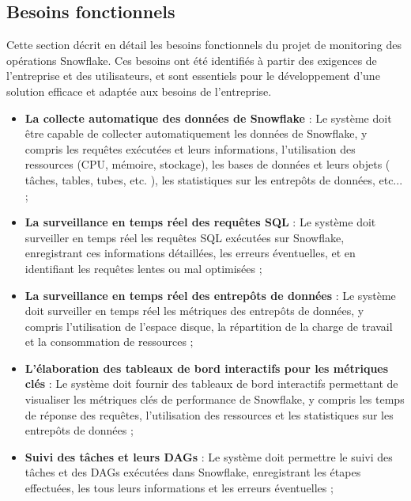     \subsection{Besoins fonctionnels}
        \par Cette section décrit en détail les besoins fonctionnels du projet de monitoring des opérations Snowflake.
        Ces besoins ont été identifiés à partir des exigences de l'entreprise et des utilisateurs, et sont essentiels pour le développement d'une solution efficace et adaptée aux besoins de l'entreprise.
    \begin{itemize}
            \item \textbf{La collecte automatique des données de Snowflake} :
            Le système doit être capable de collecter automatiquement les données de Snowflake, y compris les requêtes exécutées et leurs informations, l'utilisation des ressources (CPU, mémoire, stockage), les bases de données et leurs objets ( tâches, tables, tubes, etc. ), les statistiques sur les entrepôts de données, etc... ;
            
            \item \textbf{La surveillance en temps réel des requêtes SQL} :
            Le système doit surveiller en temps réel les requêtes SQL exécutées sur Snowflake, enregistrant ces informations détaillées, les erreurs éventuelles, et en identifiant les requêtes lentes ou mal optimisées ;
            
            \item \textbf{La surveillance en temps réel des entrepôts de données} :
            Le système doit surveiller en temps réel les métriques des entrepôts de données, y compris l'utilisation de l'espace disque, la répartition de la charge de travail et la consommation de ressources ;
            
            \item \textbf{L'élaboration des tableaux de bord interactifs pour les métriques clés} :
            Le système doit fournir des tableaux de bord interactifs permettant de visualiser les métriques clés de performance de Snowflake, y compris les temps de réponse des requêtes, l'utilisation des ressources et les statistiques sur les entrepôts de données ;
            
            \item \textbf{Suivi des tâches et leurs DAGs} :
            Le système doit permettre le suivi des tâches et des DAGs exécutées dans Snowflake, enregistrant les étapes effectuées, les tous leurs informations et les erreurs éventuelles ;
            

\end{itemize}
